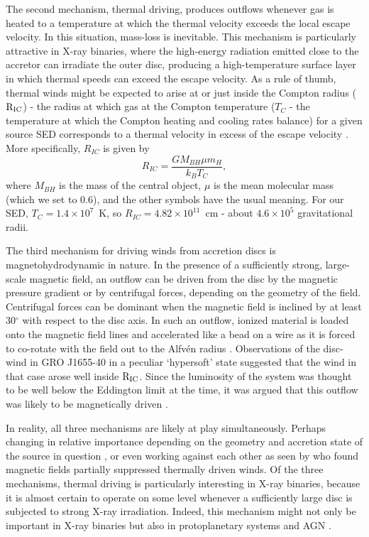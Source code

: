 \documentclass[a4paper,fleqn,usenatbib]{mnras}
\begin{document}
The second mechanism, thermal driving, produces outflows whenever gas
is heated to a temperature at which the thermal velocity exceeds
the local escape velocity. In this situation, mass-loss is
inevitable. This mechanism is particularly attractive in 
X-ray binaries, where the high-energy radiation emitted close to the
accretor can irradiate the outer disc, producing a high-temperature
surface layer in which thermal speeds can exceed the escape velocity. As a rule of thumb, thermal winds might be expected
to arise at or just inside the Compton radius ($\rm{R_{IC}}$) - the radius at which gas at the Compton temperature ($T_C$ - 
the temperature at which the Compton heating and cooling rates balance)
for a given source SED corresponds to a thermal velocity in excess of
the escape velocity \citep{1983ApJ...271...70B}. More specifically,
$R_{IC}$ is given by 
\begin{equation}
R_{IC}=\frac{GM_{BH}\mu m_H}{k_BT_C},
\end{equation}
where $M_{BH}$ is the mass of the central object, $\mu$ is the 
mean molecular mass (which we set to 0.6), and the other symbols have the usual meaning. 
For our SED, $T_C=1.4\times10^7$~K, so $R_{IC}=4.82\times10^{11}$~cm - about $4.6\times10^5$ gravitational
radii.


The third mechanism for driving winds from accretion discs is
magnetohydrodynamic in nature. In the presence of a sufficiently
strong, large-scale magnetic field, an outflow can be driven from the
disc by the magnetic pressure gradient or by centrifugal forces,
depending on the geometry of the field. Centrifugal forces can be
dominant when the magnetic field is inclined by at least 30$^\circ$
with respect to the disc axis.  In such an outflow, ionized material
is loaded onto the magnetic field lines and accelerated like a bead on
a wire as it is forced to co-rotate with the field out to the
Alfv\'{e}n radius \citep{1982MNRAS.199..883B,2009Natur.458..481N}. 
Observations of the disc-wind in GRO J1655-40 in a
peculiar `hypersoft' state suggested that the wind in that case arose
well inside $\rm{R_{IC}}$. Since the luminosity of the system was
thought to be well below the Eddington limit at the time, it was
argued that this outflow was likely to be magnetically driven 
\citep[but also see \citealt{2006ApJ...652L.117N,2015MNRAS.451..475U,2016ApJ...823..159S}]
{1992ApJS...80..753S,2006Natur.441..953M,2008ApJ...680.1359M,2009ApJ...701..865K}.

In reality, all three mechanisms are likely at play simultaneously. 
Perhaps changing in relative importance depending on the geometry and
accretion state of the source in question \cite[e.g.][]{
2007A&ARv..15....1D,2014SSRv..183..323F}, or even working against each 
other as seen by \cite{2018MNRAS.481.2628W} who found magnetic fields
partially suppressed thermally driven winds.
Of the three mechanisms,
thermal driving is particularly interesting in X-ray binaries, because
it is almost certain to operate on some level whenever a
sufficiently large disc is subjected to strong X-ray
irradiation. Indeed, this mechanism might not only be important in
X-ray binaries but also in protoplanetary systems
\cite[e.g.][]{2012MNRAS.422.1880O} and AGN \cite[e.g.][]{2018MNRAS.476.4395B}. 
\end{document}
